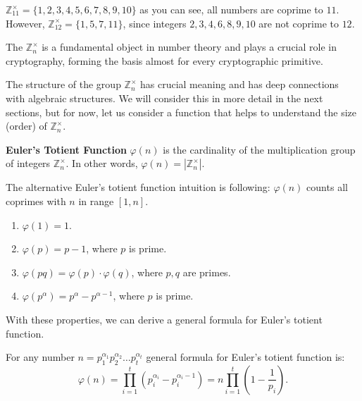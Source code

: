 \documentclass[../lecture-notes-148x210.tex]{subfiles}
\begin{document}
\begin{example}
    $\mathbb{Z}_{11}^{\times} = \{1, 2, 3, 4, 5, 6, 7, 8, 9, 10\}$ as you can see, 
    all numbers are coprime to $11$.
    However, $\mathbb{Z}_{12}^{\times} = \{1, 5, 7, 11\}$, since 
    integers $2, 3, 4, 6, 8, 9, 10$ are not coprime to $12$. 
\end{example}

The $\mathbb{Z}_{n}^{\times}$ is a fundamental object in number theory and 
plays a crucial role in cryptography, forming the basis almost for every cryptographic primitive.

The structure of the group $\mathbb{Z}_{n}^{\times}$ has crucial meaning and has deep connections 
with algebraic structures. We will consider this in more detail in the next sections, but for now, 
let us consider a function that helps to understand the size (order) of $\mathbb{Z}_{n}^{\times}$. 

\begin{definition} \label{def:euler_totient_function}
    \textbf{Euler's Totient Function} $\varphi(n)$ is the cardinality of the multiplication 
    group of integers $\mathbb{Z}_n^{\times}$. In other words, $\varphi(n) = |\mathbb{Z}_n^{\times}|$.
\end{definition}

\begin{remark}
    The alternative Euler's totient function intuition is following: $\varphi(n)$ counts all coprimes with $n$ in range $[1, n]$. 
\end{remark}

\begin{lemma} 
    \hfill
    \begin{enumerate}
        \item $\varphi(1) = 1$.
        \item $\varphi(p) = p - 1$, where $p$ is prime.
        \item $\varphi(pq) = \varphi(p) \cdot \varphi(q)$, where $p, q$ are primes.
        \item $\varphi(p^{\alpha}) = p^{\alpha} - p^{\alpha - 1}$, where $p$ is prime.        
    \end{enumerate}    
\end{lemma}

With these properties, we can derive a general formula for Euler's totient function. 

\begin{corollary}
    For any number $n = p_{1}^{\alpha_1}p_{2}^{\alpha_2} \dots p_{t}^{\alpha_t}$ general formula for Euler's totient function is: 
    \begin{equation*}
        \varphi(n) = \prod_{i = 1}^{t} \left( p_{i}^{\alpha_i} - p_{i}^{\alpha_i - 1} \right) = n \prod_{i = 1}^{t} \left( 1 - \frac{1}{p_i} \right).
    \end{equation*}
\end{corollary}
\end{document}
